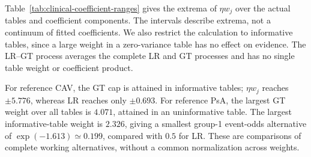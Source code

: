 \documentclass[12pt]{article}
\theoremstyle{definition}
\theoremstyle{remark}
\begin{document}
Table~\ref{tab:clinical-coefficient-ranges} gives the extrema of $\eta w_j$ over the actual tables and coefficient components. The intervals describe extrema, not a continuum of fitted coefficients. We also restrict the calculation to informative tables, since a large weight in a zero-variance table has no effect on evidence. The LR--GT process averages the complete LR and GT processes and has no single table weight or coefficient product.

For reference CAV, the GT cap is attained in informative tables; $\eta w_j$ reaches $\pm5.776$, whereas LR reaches only $\pm0.693$. For reference PsA, the largest GT weight over all tables is $4.071$, attained in an uninformative table. The largest informative-table weight is $2.326$, giving a smallest group-1 event-odds alternative of $\exp(-1.613)\simeq0.199$, compared with $0.5$ for LR. These are comparisons of complete working alternatives, without a common normalization across weights.
\end{document}
